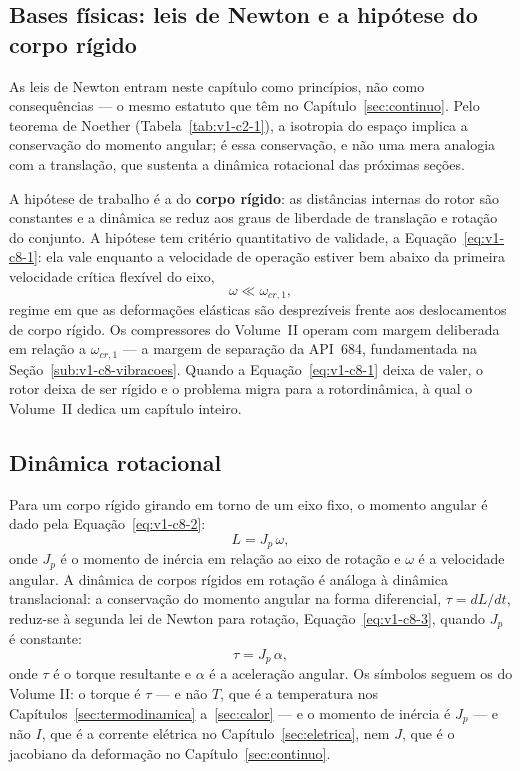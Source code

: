 \documentclass[12pt,a4paper]{article}
\numberwithin{equation}{section}
\numberwithin{table}{section}
\numberwithin{figure}{section}
\begin{document}
\subsection{Bases físicas: leis de Newton e a hipótese do corpo
rígido}\label{sub:v1-c8-bases}

As leis de Newton entram neste capítulo como princípios, não como
consequências --- o mesmo estatuto que têm no Capítulo~\ref{sec:continuo}.
Pelo teorema de Noether (Tabela~\ref{tab:v1-c2-1}), a isotropia do espaço
implica a conservação do momento angular; é essa conservação, e não uma mera
analogia com a translação, que sustenta a dinâmica rotacional das próximas
seções.

A hipótese de trabalho é a do \textbf{corpo rígido}: as distâncias internas
do rotor são constantes e a dinâmica se reduz aos graus de liberdade de
translação e rotação do conjunto. A hipótese tem critério quantitativo de
validade, a Equação~\eqref{eq:v1-c8-1}: ela vale enquanto a velocidade de
operação estiver bem abaixo da primeira velocidade crítica flexível do eixo,
\begin{equation}\label{eq:v1-c8-1}
\omega \ll \omega_{cr,1},
\end{equation}
regime em que as deformações elásticas são desprezíveis frente aos
deslocamentos de corpo rígido. Os compressores do Volume~II operam com margem
deliberada em relação a $\omega_{cr,1}$ --- a margem de separação da API~684,
fundamentada na Seção~\ref{sub:v1-c8-vibracoes}. Quando a
Equação~\eqref{eq:v1-c8-1} deixa de valer, o rotor deixa de ser rígido e o
problema migra para a rotordinâmica, à qual o Volume~II dedica um capítulo
inteiro.

\subsection{Dinâmica rotacional}\label{sub:v1-c8-rotacional}

Para um corpo rígido girando em torno de um eixo fixo, o momento angular é
dado pela Equação~\eqref{eq:v1-c8-2}:
\begin{equation}\label{eq:v1-c8-2}
L = J_p\,\omega,
\end{equation}
onde $J_p$ é o momento de inércia em relação ao eixo de rotação e $\omega$ é
a velocidade angular. A dinâmica de corpos rígidos em rotação é análoga à
dinâmica translacional: a conservação do momento angular na forma
diferencial, $\tau = dL/dt$, reduz-se à segunda lei de Newton para rotação,
Equação~\eqref{eq:v1-c8-3}, quando $J_p$ é constante:
\begin{equation}\label{eq:v1-c8-3}
\tau = J_p \, \alpha,
\end{equation}
onde $\tau$ é o torque resultante e $\alpha$ é a aceleração angular. Os
símbolos seguem os do Volume II: o torque é $\tau$ --- e não $T$, que é a
temperatura nos Capítulos~\ref{sec:termodinamica} a~\ref{sec:calor} --- e o
momento de inércia é $J_p$ --- e não $I$, que é a corrente elétrica no
Capítulo~\ref{sec:eletrica}, nem $J$, que é o jacobiano da deformação no
Capítulo~\ref{sec:continuo}.
\end{document}

